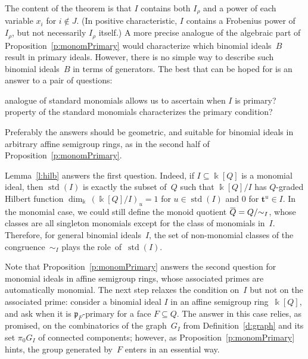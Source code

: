 \documentclass[12pt]{amsart}
\numberwithin{equation}{section}
\theoremstyle{definition}
\begin{document}
The content of the theorem is that $I$ contains both $I_\rho$ and a
power of each variable $x_i$ for $i \notin J$.  (In positive
characteristic, $I$ contains a Frobenius power of~$I_\rho$, but not
necessarily $I_\rho$ itself.)  A more precise analogue of the
algebraic part of Proposition~\ref{p:monomPrimary}
would characterize which binomial ideals~$B$ result in primary ideals.
However, there is no simple way to describe such binomial ideals~$B$
in terms of generators.
The best that can be hoped for is an answer to a pair of questions:
\begin{enumerate}
\itemWhat analogue of standard monomials allows us to ascertain when $I$ is
primary?
\itemWhat property of the standard monomials characterizes the primary
condition?
\end{enumerate}
Preferably the answers should be geometric, and suitable for binomial
ideals in arbitrary affine semigroup rings, as in the second half of
Proposition~\ref{p:monomPrimary}.

Lemma~\ref{l:hilb} answers the first question.  Indeed, if $I
\subseteq {\Bbbk}[Q]$ is a monomial ideal, then $\operatorname{std}(I)$ is exactly the
subset of~$Q$ such that ${\Bbbk}[Q]/I$ has $Q$-graded Hilbert function
$\dim_{\Bbbk}\,({\Bbbk}[Q]/I)_u = 1$ for $u \in \operatorname{std}(I)$ and $0$ for ${\mathbf{t}}^u
\in I$.  In the monomial case, we could still define the monoid
quotient ${\hspace{.15ex}{{\overline{{\hspace{-.15ex}Q\hspace{-.25ex}}}}{}}\hspace{.25ex}} = Q/{\mathord\sim}_I$, whose classes are all singleton monomials
except for the class of monomials in~$I$.  Therefore, for general
binomial ideals~$I$, the set of non-monomial classes of the
congruence~${\mathord\sim}_I$ plays the role~of~$\operatorname{std}(I)$.

Note that Proposition~\ref{p:monomPrimary} answers the second question
for monomial ideals in affine semigroup rings, whose associated primes
are automatically monomial.  The next step relaxes the condition
on~$I$ but not on the associated prime:
consider a binomial ideal $I$ in an affine semigroup ring~${\Bbbk}[Q]$,
and ask when it is ${\mathfrak{p}}_F$-primary for a
face $F \subseteq Q$.  The answer in this case relies, as promised, on
the combinatorics of the graph~$G_I$ from Definition~\ref{d:graph} and
its set $\pi_0 G_I$ of connected components; however, as
Proposition~\ref{p:monomPrimary} hints, the group generated by~$F$
enters in an essential way.
\end{document}
